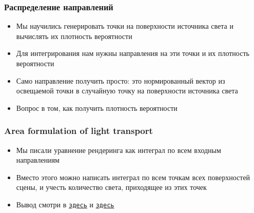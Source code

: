 \documentclass[10pt]{beamer}
\begin{document}
\begin{frame}
\frametitle{Распределение направлений}
\begin{itemize}
\item Мы научились генерировать точки на поверхности источника света и вычислять их плотность вероятности
\pause
\item Для интегрирования нам нужны направления на эти точки и их плотность вероятности
\pause
\item Само направление получить просто: это нормированный вектор из освещаемой точки в случайную точку на поверхности источника света
\pause
\item Вопрос в том, как получить плотность вероятности
\end{itemize}
\end{frame}

\begin{frame}
\frametitle{Area formulation of light transport}
\begin{itemize}
\item Мы писали уравнение рендеринга как интеграл по всем входным направлениям
\pause
\item Вместо этого можно написать интеграл по всем точкам всех поверхностей сцены, и учесть количество света, приходящее из этих точек
\pause
\item Вывод смотри в \href{https://www.cg.tuwien.ac.at/courses/Rendering/2020/slides/04_The_Rendering_Equation_v20200515.pdf}{\texttt{здесь}} и \href{https://www.dgp.toronto.edu/~lessig/dissertation/files/area_formulation.pdf}{\texttt{здесь}}
\end{itemize}
\end{frame}
\end{document}
